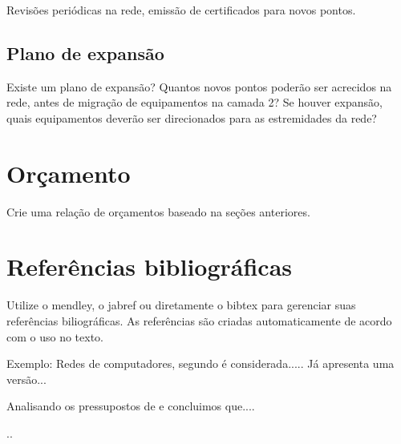 \documentclass[	DIV=calc,%
							paper=a4,%
							fontsize=12pt,%
							onecolumn]{scrartcl}	 					%
\begin{document}
Revisões periódicas na rede, emissão de certificados para novos pontos.

\subsection{Plano de expansão}
Existe um plano de expansão? Quantos novos pontos poderão ser acrecidos na rede, antes de migração de equipamentos na camada 2? Se houver expansão, quais equipamentos deverão ser direcionados para as estremidades da rede? 


\section{Orçamento}
Crie uma relação de orçamentos baseado na seções anteriores.

\section{Referências bibliográficas}
Utilize o mendley, o jabref ou diretamente o bibtex para gerenciar suas referências biliográficas. As referências são criadas automaticamente de acordo com o uso no texto.

Exemplo: Redes de computadores, segundo \cite{t2013} é considerada..... Já \cite{kurose2010} apresenta uma versão...

Analisando os pressupostos de \cite{ref3} e \cite{ref4} concluimos que....


\renewcommand\refname{} %

  

..
\end{document}
